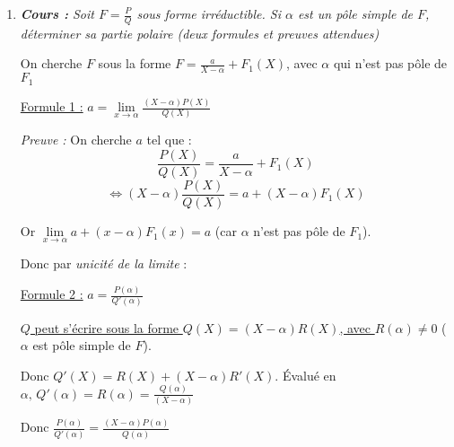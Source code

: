 \documentclass[11pt]{article}
\begin{document}
	\begin{enumerate}
		\item \textit{\large \textbf{Cours :} Soit \(F = \frac{P}{Q}\) sous forme irréductible. Si \(\alpha\) est un pôle simple de \(F\), déterminer sa partie polaire (deux formules et preuves attendues)}
				
		On cherche \(F\) sous la forme \(\displaystyle F = \frac{a}{X - \alpha} + F_1(X)\), avec \(\alpha\) qui n'est pas pôle de \(F_1\)
		
		\bigskip
		
		\underline{Formule 1 :} \(\displaystyle a = \lim\limits_{x \to \alpha} \frac{(X-\alpha)P(X)}{Q(X)}\)
		
		\textit{Preuve :} On cherche \(a\) tel que : 
		\[
			\frac{P(X)}{Q(X)} = \frac{a}{X-\alpha} + F_1(X)
		\]
		\[
			\Longleftrightarrow (X-\alpha)  \frac{P(X)}{Q(X)} = a + (X- \alpha) F_1(X)
		\]
		
		Or \( \lim\limits_{x \to \alpha} a + (x - \alpha)F_1(x) = a\) (car \(\alpha\) n'est pas pôle de \(F_1\)).
		
		Donc par \textit{unicité de la limite} : 
		
		\bigskip
		
		\underline{Formule 2 :} \(\displaystyle a = \frac{P(\alpha)}{Q'(\alpha)}\)
		
		 \underline{\(Q\) peut s'écrire sous la forme \(Q(X) = (X - \alpha) R(X)\), avec \(R(\alpha) \neq 0\)} (\(\alpha\) est pôle simple de \(F\)).
		 
		 Donc \(Q'(X) = R(X) + (X-\alpha) R'(X)\). Évalué en \(\alpha, \, Q'(\alpha) = R(\alpha) = \frac{Q(\alpha)}{(X-\alpha)}\)
		 
		 Donc \(\displaystyle \frac{P(\alpha)}{Q'(\alpha)} = \frac{(X - \alpha)P(\alpha)}{Q(\alpha)}\)
	 
 	\end{enumerate}
	
\end{document}
